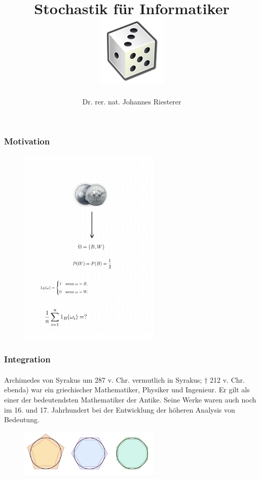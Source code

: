 \documentclass{beamer}
\begin{document}
\title[Stochastik] %
{Stochastik für Informatiker
\\
\includegraphics[scale=0.5]{img/craps}
}
\subtitle{}
\author[Dr. Johannes Riesterer] %
{Dr.  rer. nat. Johannes Riesterer}

\date[KPT 2004] %
{}

\subject{Stochastik}

\begin{frame}
    \frametitle{Motivation}
\framesubtitle{}
\begin{figure}[htp]
      \centering
    \includegraphics[width=0.6\textwidth]{img/coinflip.png}
\end{figure}
 \end{frame}


 \begin{frame}
    \frametitle{Integration}
\framesubtitle{}
Archimedes von Syrakus  um 287 v. Chr. vermutlich in Syrakus; † 212 v. Chr. ebenda) war ein griechischer Mathematiker, Physiker und Ingenieur. Er gilt als einer der bedeutendsten Mathematiker der Antike. Seine Werke waren auch noch im 16. und 17. Jahrhundert bei der Entwicklung der höheren Analysis von Bedeutung. 

\begin{figure}[htp]
      \centering
    \includegraphics[width=0.6\textwidth]{img/750px-Archimedes_pi.png}
\end{figure}
 \end{frame}
\end{document}
